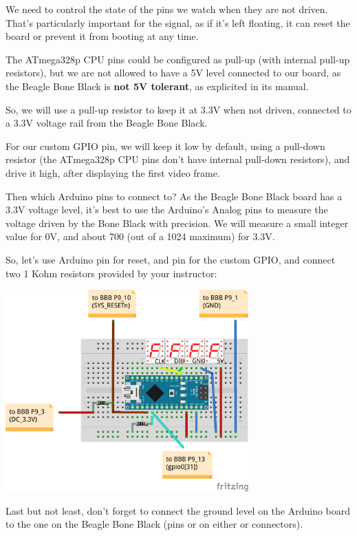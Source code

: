 We need to control the state of the pins we watch when they are not
driven. That's particularly important for the  signal,
as if it's left floating, it can reset the board or prevent it from
booting at any time.

The ATmega328p CPU pins could be configured as pull-up (with internal
pull-up resistors), but we are not allowed to have a 5V level
connected to our board, as the Beagle Bone Black is {\bf not 5V tolerant},
as explicited in its manual.

So, we will use a pull-up resistor to keep it at 3.3V when not driven,
connected to a 3.3V voltage rail from the Beagle Bone Black.

For our custom GPIO pin, we will keep it low by default, using
a pull-down resistor (the ATmega328p CPU pins don't have internal
pull-down resistors), and drive it high, after displaying the first
video frame.

Then which Arduino pins to connect to? As the Beagle Bone Black board
has a 3.3V voltage level, it's best to use the Arduino's Analog pins to
measure the voltage driven by the Bone Black with precision. We will measure a
small integer value for 0V, and about 700 (out of a 1024 maximum) for
3.3V.

So, let's use Arduino pin  for reset, and pin  for the
custom GPIO, and connect two 1 Kohm resistors provided by your instructor:

\begin{center}
\includegraphics[width=0.7\textwidth]{labs/boot-time-hardware-measurement/nano-final.png}
\end{center}

Last but not least, don't forget to connect the ground level
on the Arduino board to the one on the Beagle Bone Black (pins 
or  on either  or  connectors).

